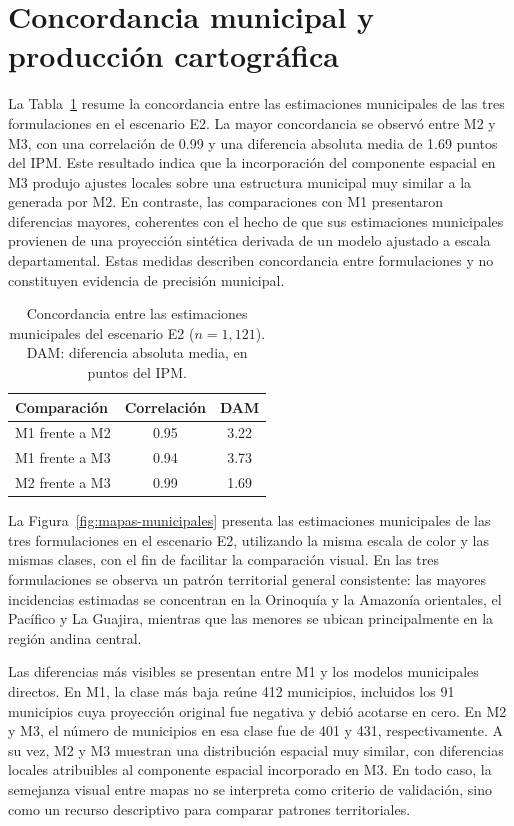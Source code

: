 \section{Concordancia municipal y producción cartográfica}
\label{sec:res-cartografia}

La Tabla~\ref{tab:concordancia-e2} resume la concordancia entre las estimaciones municipales de las tres formulaciones en el escenario E2. La mayor concordancia se observó entre M2 y M3, con una correlación de 0.99 y una diferencia absoluta media de 1.69 puntos del IPM. Este resultado indica que la incorporación del componente espacial en M3 produjo ajustes locales sobre una estructura municipal muy similar a la generada por M2. En contraste, las comparaciones con M1 presentaron diferencias mayores, coherentes con el hecho de que sus estimaciones municipales provienen de una proyección sintética derivada de un modelo ajustado a escala departamental. Estas medidas describen concordancia entre formulaciones y no constituyen evidencia de precisión municipal.

\begin{table}[!htbp]
\centering
\small
\caption{Concordancia entre las estimaciones municipales del escenario E2 ($n=1{,}121$). DAM: diferencia absoluta media, en puntos del IPM.}
\label{tab:concordancia-e2}
\renewcommand{\arraystretch}{1.2}
\begin{tabular}{l c c}
\hline
Comparación & Correlación & DAM \\
\hline
M1 frente a M2 & 0.95 & 3.22 \\
M1 frente a M3 & 0.94 & 3.73 \\
M2 frente a M3 & 0.99 & 1.69 \\
\hline
\end{tabular}
\end{table}

La Figura~\ref{fig:mapas-municipales} presenta las estimaciones municipales de las tres formulaciones en el escenario E2, utilizando la misma escala de color y las mismas clases, con el fin de facilitar la comparación visual. En las tres formulaciones se observa un patrón territorial general consistente: las mayores incidencias estimadas se concentran en la Orinoquía y la Amazonía orientales, el Pacífico y La Guajira, mientras que las menores se ubican principalmente en la región andina central. 

Las diferencias más visibles se presentan entre M1 y los modelos municipales directos. En M1, la clase más baja reúne 412 municipios, incluidos los 91 municipios cuya proyección original fue negativa y debió acotarse en cero. En M2 y M3, el número de municipios en esa clase fue de 401 y 431, respectivamente. A su vez, M2 y M3 muestran una distribución espacial muy similar, con diferencias locales atribuibles al componente espacial incorporado en M3. En todo caso, la semejanza visual entre mapas no se interpreta como criterio de validación, sino como un recurso descriptivo para comparar patrones territoriales.

